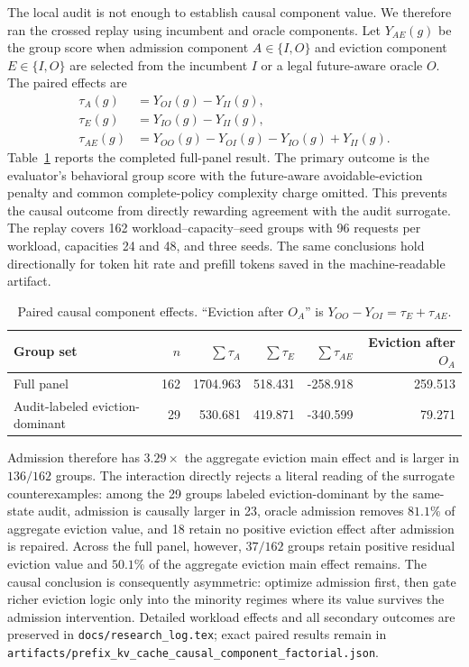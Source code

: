 \documentclass[11pt]{article}
\newcommand{\filepath}[1]{\nolinkurl{#1}}
\begin{document}
The local audit is not enough to establish causal component value.  We therefore ran
the crossed replay using incumbent and oracle components.  Let
\(Y_{AE}(g)\) be the group score when admission component \(A\in\{I,O\}\) and eviction
component \(E\in\{I,O\}\) are selected from the incumbent \(I\) or a legal future-aware
oracle \(O\).  The paired effects are
\begin{align}
  \tau_A(g)&=Y_{OI}(g)-Y_{II}(g),\\
  \tau_E(g)&=Y_{IO}(g)-Y_{II}(g),\\
  \tau_{AE}(g)&=Y_{OO}(g)-Y_{OI}(g)-Y_{IO}(g)+Y_{II}(g).
\end{align}
Table~\ref{tab:causal-component-factorial} reports the completed full-panel result.
The primary outcome is the evaluator's behavioral group score with the future-aware
avoidable-eviction penalty and common complete-policy complexity charge omitted.  This
prevents the causal outcome from directly rewarding agreement with the audit surrogate.
The replay covers 162
workload--capacity--seed groups with 96 requests per workload, capacities 24 and 48,
and three seeds.  The same conclusions hold directionally for token hit rate and
prefill tokens saved in the machine-readable artifact.

\begin{table}[H]
\centering
\small
\caption{Paired causal component effects.  ``Eviction after \(O_A\)'' is
\(Y_{OO}-Y_{OI}=\tau_E+\tau_{AE}\).}
\label{tab:causal-component-factorial}
\begin{tabular}{lrrrrr}
\toprule
Group set & \(n\) & \(\sum\tau_A\) & \(\sum\tau_E\) &
\(\sum\tau_{AE}\) & Eviction after \(O_A\) \\
\midrule
Full panel & 162 & 1704.963 & 518.431 & -258.918 & 259.513 \\
Audit-labeled eviction-dominant & 29 & 530.681 & 419.871 & -340.599 & 79.271 \\
\bottomrule
\end{tabular}
\end{table}

Admission therefore has \(3.29\times\) the aggregate eviction main effect and is
larger in \(136/162\) groups.  The interaction directly rejects a literal reading of
the surrogate counterexamples: among the 29 groups labeled eviction-dominant by the
same-state audit, admission is causally larger in 23, oracle admission removes
\(81.1\%\) of aggregate eviction value, and 18 retain no positive eviction effect
after admission is repaired.  Across the full panel, however, \(37/162\) groups retain
positive residual eviction value and \(50.1\%\) of the aggregate eviction main effect
remains.  The causal conclusion is consequently asymmetric: optimize admission first,
then gate richer eviction logic only into the minority regimes where its value
survives the admission intervention.  Detailed workload effects and all secondary
outcomes are preserved in \filepath{docs/research_log.tex}; exact paired results remain
in \filepath{artifacts/prefix_kv_cache_causal_component_factorial.json}.
\end{document}
